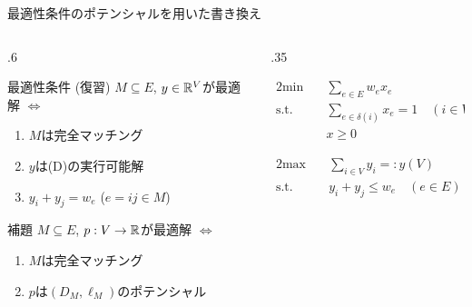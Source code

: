 \documentclass[14pt,aspectratio=169,xcolor=dvipsnames,table,onlytextwidth,dvipdfmx]{beamer}
\begin{document}
\begin{frame}{最適性条件のポテンシャルを用いた書き換え}
    
    \begin{columns}[T]
    \begin{column}{.6\textwidth}
        \begin{block}{最適性条件 (復習)}
        $M \subseteq E$, $y \in \mathbb{R}^V$が最適解 
        $\iff$
        \begin{enumerate}
            \item $M$は完全マッチング
            \item $y$は(D)の実行可能解
            \item $y_i + y_j = w_e$ \quad ($e = ij \in M$)
        \end{enumerate}
        \end{block}

        \begin{alertblock}{補題}
            $M\subseteq E$, $p: V \to \mathbb{R}$が最適解
            $\iff$
            \begin{enumerate}
                \item $M$は完全マッチング
                \item $p$は$(D_M, \ell_M)$のポテンシャル
            \end{enumerate}
        \end{alertblock}
    \end{column}
    \begin{column}{.35\textwidth}
        \footnotesize
        \begin{primal}
        \begin{alignat*}{2}
            \text{min} & \quad  \sum_{e \in E} w_e x_e \\
            \text{s.t.} & \quad \sum_{e \in \delta(i)} x_e = 1  \quad (i \in V) \\
            & \quad x \geq 0 
        \end{alignat*}
    \end{primal}
    \begin{dual}
        \setlength{\abovedisplayskip}{0pt}
        \begin{alignat*}{2}
            \text{max} & \quad  \sum_{i \in V} y_i =: y(V) \\
            \text{s.t.} & \quad y_i + y_j \leq w_e \quad (e \in E) 
        \end{alignat*}
    \end{dual}
    \end{column}
    \end{columns}
\end{frame}
\end{document}
